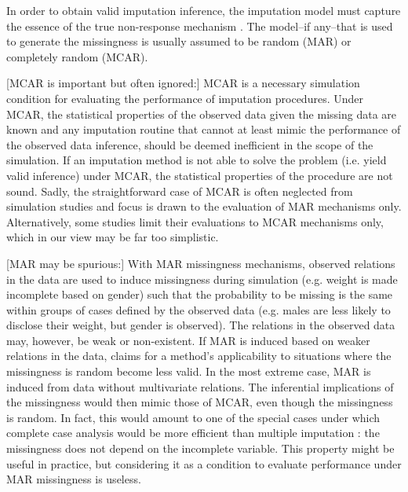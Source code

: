 \documentclass[bimj,fleqn]{w-art}
\theoremstyle{plain}
\theoremstyle{definition}
\begin{document}
In order to obtain valid imputation inference, the imputation model must capture the essence of the true non-response mechanism \citep{meng94}. The model--if any--that is used to generate the missingness is usually assumed to be random (MAR) or completely random (MCAR). 

[MCAR is important but often ignored:] MCAR is a necessary simulation condition for evaluating the performance of imputation procedures. Under MCAR, the statistical properties of the observed data given the missing data are known and any imputation routine that cannot at least mimic the performance of the observed data inference, should be deemed inefficient in the scope of the simulation. If an imputation method is not able to solve the problem (i.e. yield valid inference) under MCAR, the statistical properties of the procedure are not sound. Sadly, the straightforward case of MCAR is often neglected from simulation studies and focus is drawn to the evaluation of MAR mechanisms only. Alternatively, some studies limit their evaluations to MCAR mechanisms only, which in our view may be far too simplistic. 

[MAR may be spurious:] With MAR missingness mechanisms, observed relations in the data are used to induce missingness during simulation (e.g. weight is made incomplete based on gender) such that the probability to be missing is the same within groups of cases defined by the observed data (e.g. males are less likely to disclose their weight, but gender is observed). The relations in the observed data may, however, be weak or non-existent. If MAR is induced based on weaker relations in the data, claims for a method's applicability to situations where the missingness is random become less valid. In the most extreme case, MAR is induced from data without multivariate relations. The inferential implications of the missingness would then mimic those of MCAR, even though the missingness is random. In fact, this would amount to one of the special cases under which complete case analysis would be more efficient than multiple imputation \citep[see e.g.][p. 48]{fimd}: the missingness does not depend on the incomplete variable. This property might be useful in practice, but considering it as a condition to evaluate performance under MAR missingness is useless.  


\end{document}
